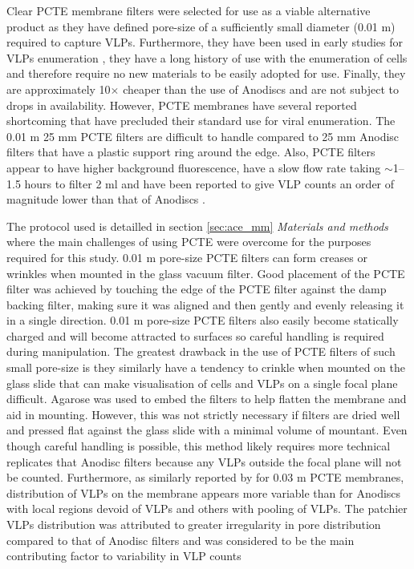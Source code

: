 Clear \ac{PCTE} membrane filters were selected for use as a viable alternative product as they have defined pore-size of a sufficiently small diameter (0.01 \textmu{}m) required to capture \acp{VLP}. 
Furthermore, they have been used in early studies for \acp{VLP} enumeration \cite{Hara1991, Proctor1992}, they have a long history of use with  the enumeration of cells \cite{Hobbie1977} and therefore require no new materials to be easily adopted for use.
Finally, they are approximately 10$\times$ cheaper than the use of Anodiscs and are not subject to drops in availability.
However, \ac{PCTE} membranes have several reported shortcoming that have precluded their standard use for viral enumeration.
The 0.01 \textmu{}m 25 mm \ac{PCTE} filters are difficult to handle compared to 25 mm Anodisc filters that have a plastic support ring around the edge.
Also, \ac{PCTE} filters appear to have higher background fluorescence, have a slow flow rate taking $\sim$1--1.5 hours to filter 2 ml \cite{Hara1991} and have been reported to give \ac{VLP} counts an order of magnitude lower than that of Anodiscs \cite{Budinoff2011}.%

The protocol used is detailled in section \ref{sec:ace_mm} \emph{Materials and methods} where the main challenges of using \ac{PCTE} were overcome for the purposes required for this study.
0.01 \textmu{}m pore-size \ac{PCTE} filters can form creases or wrinkles when mounted in the glass vacuum filter.
Good placement of the \ac{PCTE} filter was achieved by touching the edge of the \ac{PCTE} filter against the damp backing filter, making sure it was aligned and then gently and evenly releasing it in a single direction. 
0.01 \textmu{}m pore-size \ac{PCTE} filters also easily become statically charged and will become attracted to surfaces so careful handling is required during manipulation. 
The greatest drawback in the use of \ac{PCTE} filters of such small pore-size is they similarly have a tendency to crinkle when mounted on the glass slide that can make visualisation of cells and \acp{VLP} on a single focal plane difficult.
Agarose was used to embed the filters to help flatten the membrane and aid in mounting.
However, this was not strictly necessary if filters are dried well and pressed flat against the glass slide with a minimal volume of mountant.
Even though careful handling is possible, this method likely requires more technical replicates that Anodisc filters because any \acp{VLP} outside the focal plane will not be counted.
Furthermore, as similarly reported by \citet{Diemer2012} for 0.03 \textmu{}m \ac{PCTE} membranes, distribution of \acp{VLP} on the membrane appears more variable than for Anodiscs with local regions devoid of \acp{VLP} and others with pooling of \acp{VLP}.
The patchier \acp{VLP} distribution was attributed to greater irregularity in pore distribution compared to that of Anodisc filters and was considered to be the main contributing factor to variability in \ac{VLP} counts \cite{Diemer2012}

